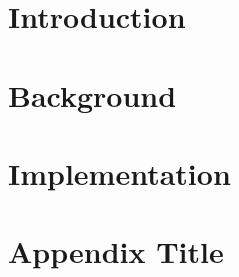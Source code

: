 \documentclass[12pt,a4paper]{report}
\begin{document}


\onehalfspacing


\tableofcontents
\listoffigures

\chapter{Introduction}


\chapter{Background}


\chapter{Implementation}



\appendix

\chapter{Appendix Title}

\printbibliography
\end{document}
